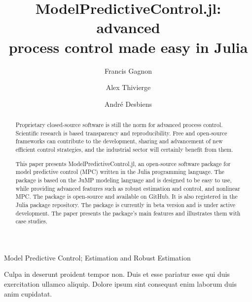 \documentclass{ifacconf}
\begin{document}
\begin{frontmatter}

\title{ModelPredictiveControl.jl: advanced\\process control made easy in Julia}

\author[First]{Francis Gagnon} 
\author[First]{Alex Thivierge} 
\author[Second]{André Desbiens}

\address[First]{Jumine Inc., Quebec City, G1S 2K4, Canada}
\address[Second]{Process Observation and Optimization Laboratory (LOOP), Université Laval, Quebec City, G1V 0A6, Canada}

\begin{abstract} 
Proprietary closed-source software is still the norm for advanced process control. Scientific research is based transparency and reproducibility. Free and open-source frameworks can contribute to the development, sharing and advancement of new efficient control strategies, and the industrial sector will certainly benefit from them.  


This paper presents ModelPredictiveControl.jl, an open-source software package for model predictive control (MPC) written in the Julia programming language. The package is based on the JuMP modeling language and is designed to be easy to use, while providing advanced features such as robust estimation and control, and nonlinear MPC. The package is open-source and available on GitHub. It is also registered in the Julia package repository. The package is currently in beta version and is under active development. The paper presents the package's main features and illustrates them with case studies. 


\end{abstract}


\begin{keyword}
Model Predictive Control; Estimation and Robust Estimation
\end{keyword}

\end{frontmatter}






\begin{ack}
Culpa in deserunt proident tempor non. Duis et esse pariatur esse qui duis exercitation ullamco aliquip. Dolore ipsum sint consequat enim laborum duis anim cupidatat.
\end{ack}


\end{document}
